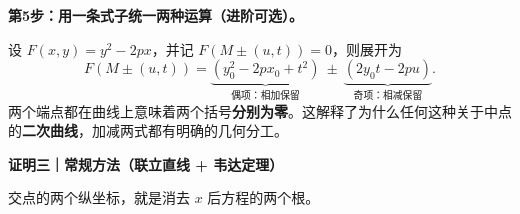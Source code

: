 \begin{proofbox}
\par\noindent\textbf{第5步：用一条式子统一两种运算（进阶可选）。}\par\nobreak\smallskip
设 $F(x,y)=y^2-2px$，并记
$F(M\pm(u,t))=0$，则展开为
\[
\boxed{F(M\pm(u,t))=
 \underbrace{(y_0^2-2px_0+t^2)}_{\text{偶项：相加保留}}
 \ \pm\ \underbrace{(2y_0t-2pu)}_{\text{奇项：相减保留}}}.
\]
两个端点都在曲线上意味着两个括号\textbf{分别为零}。这解释了为什么任何这种关于中点的\textbf{二次曲线}，加减两式都有明确的几何分工。
\par\medskip
\begin{minipage}{\linewidth}
\par\medskip
\begin{minipage}{\linewidth}
\noindent
\textbf{\textcolor{CProof}{证明三｜常规方法（联立直线 + 韦达定理）}}\par\nobreak\smallskip
\par
\begin{minipage}{\linewidth}
\begin{center}

\par\small 交点的两个纵坐标，就是消去 $x$ 后方程的两个根。
\end{center}
\end{minipage}\par
\end{minipage}
\par

\par

\end{minipage}



\end{proofbox}
